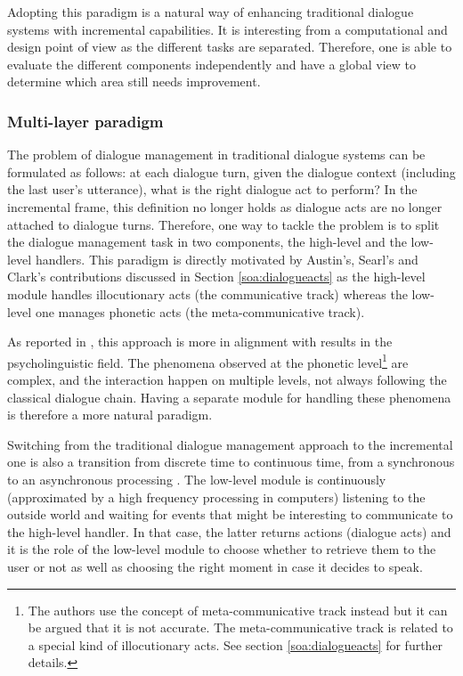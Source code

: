 			Adopting this paradigm is a natural way of enhancing traditional dialogue systems with incremental capabilities. It is interesting from a computational and design point of view as the different tasks are separated. Therefore, one is able to evaluate the different components independently \cite{Baumann2011} and have a global view to determine which area still needs improvement.

		\subsubsection{Multi-layer paradigm}
		
			The problem of dialogue management in traditional dialogue systems can be formulated as follows: at each dialogue turn, given the dialogue context (including the last user's utterance), what is the right dialogue act to perform? In the incremental frame, this definition no longer holds as dialogue acts are no longer attached to dialogue turns. Therefore, one way to tackle the problem is to split the dialogue management task in two components, the high-level and the low-level handlers. This paradigm is directly motivated by Austin's, Searl's and Clark's contributions discussed in Section \ref{soa:dialogueacts} as the high-level module handles illocutionary acts (the communicative track) whereas the low-level one manages phonetic acts (the meta-communicative track).
				
				As reported in \cite{Lemon2003}, this approach is more in alignment with results in the psycholinguistic field. The phenomena observed at the phonetic level\footnote{The authors use the concept of meta-communicative track instead but it can be argued that it is not accurate. The meta-communicative track is related to a special kind of illocutionary acts. See section \ref{soa:dialogueacts} for further details.} are complex, and the interaction happen on multiple levels, not always following the classical dialogue chain. Having a separate module for handling these phenomena is therefore a more natural paradigm.
				
				Switching from the traditional dialogue management approach to the incremental one is also a transition from discrete time to continuous time, from a synchronous to an asynchronous processing \cite{Raux2007}. The low-level module is continuously (approximated by a high frequency processing in computers) listening to the outside world and waiting for events that might be interesting to communicate to the high-level handler. In that case, the latter returns actions (dialogue acts) and it is the role of the low-level module to choose whether to retrieve them to the user or not as well as choosing the right moment in case it decides to speak.
				
